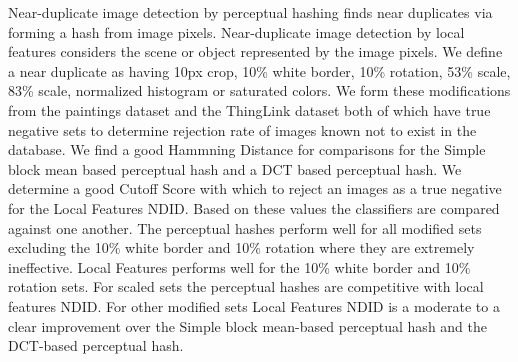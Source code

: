 \documentclass[english,12pt,a4paper,pdftex,elec,utf8]{aaltothesis}
\begin{document}


\makecoverpage




\begin{abstractpage}[english]
  Near-duplicate image detection by perceptual hashing finds near duplicates via forming a hash from image pixels. Near-duplicate image detection by local features considers the scene or object represented by the image pixels. We define a near duplicate as having 10px crop, 10\% white border, 10\% rotation, 53\% scale, 83\% scale, normalized histogram or saturated colors. We form these modifications from the paintings dataset and the ThingLink dataset both of which have true negative sets to determine rejection rate of images known not to exist in the database. We find a good Hammning Distance for comparisons for the Simple block mean based perceptual hash and a DCT based perceptual hash. We determine a good Cutoff Score with which to reject an images as a true negative for the Local Features NDID. Based on these values the classifiers are compared against one another. The perceptual hashes perform well for all modified sets excluding the 10\% white border and 10\% rotation where they are extremely ineffective. Local Features performs well for the 10\% white border and 10\% rotation sets. For scaled sets the perceptual hashes are competitive with local features NDID. For other modified sets Local Features NDID is a moderate to a clear improvement over the Simple block mean-based perceptual hash and the DCT-based perceptual hash.
\end{abstractpage}
\end{document}
